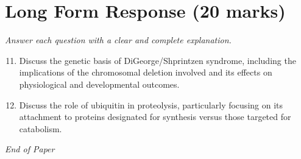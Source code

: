 \documentclass[12pt]{article}
\begin{document}
\section*{Long Form Response (20 marks)}
\textit{Answer each question with a clear and complete explanation.}
\begin{enumerate}[label=\arabic*.]
\setcounter{enumi}{10}
\item Discuss the genetic basis of DiGeorge/Shprintzen syndrome, including the implications of the chromosomal deletion involved and its effects on physiological and developmental outcomes.
\item Discuss the role of ubiquitin in proteolysis, particularly focusing on its attachment to proteins designated for synthesis versus those targeted for catabolism.
\end{enumerate}

\vfill
\noindent\textit{End of Paper}
\end{document}

